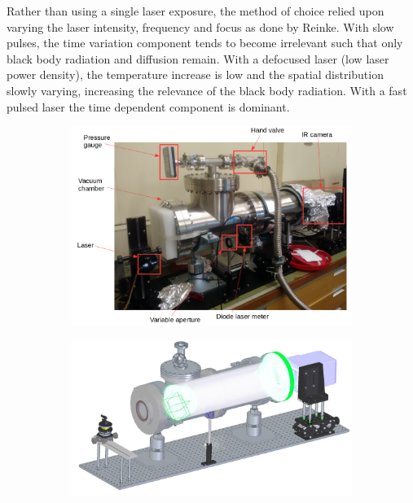 Rather than using a single laser exposure, the method of choice relied upon varying the laser intensity, frequency and focus as done by Reinke.\cite{Reinke2018a} With slow pulses, the time variation component tends to become irrelevant such that only black body radiation and diffusion remain. With a defocused laser (low laser power density), the temperature increase is low and the spatial distribution slowly varying, increasing the relevance of the black body radiation. With a fast pulsed laser the time dependent component is dominant.


\begin{figure}
     \centering
     \begin{subfigure}{0.8\linewidth}
        \centering
        \includegraphics[width=\textwidth,trim={20 0 20 0},clip]{Chapters/chapter2/figs/vacuum_setup_3.png}
        \vspace*{-5mm}
        {\color{white}\caption{\phantom{ }}\label{fig:vacuum_setup1}}
     \end{subfigure}
     \begin{subfigure}{0.8\linewidth}
        \centering
        \includegraphics[width=\textwidth,trim={0 0 0 0},clip]{Chapters/chapter2/figs/vacuum_setup2.png}

\end{subfigure}
\end{figure}
